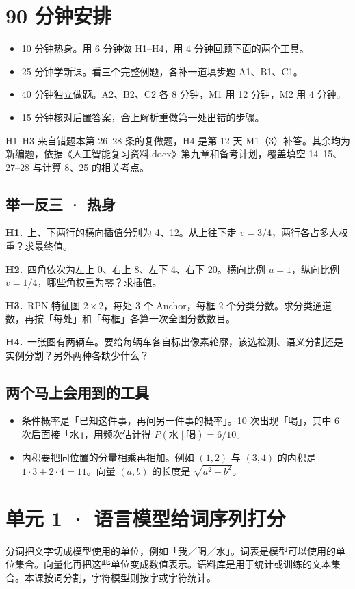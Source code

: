 \documentclass[UTF8,a4paper,11pt]{ctexart}
\newcommand{\CompactQuestion}[2]{\par\noindent\textbf{#1.}\ #2\par\vspace{.8em}}
\begin{document}
\section{90 分钟安排}
\begin{itemize}
\item 10 分钟热身。用 6 分钟做 H1–H4，用 4 分钟回顾下面的两个工具。
\item 25 分钟学新课。看三个完整例题，各补一道填步题 A1、B1、C1。
\item 40 分钟独立做题。A2、B2、C2 各 8 分钟，M1 用 12 分钟，M2 用 4 分钟。
\item 15 分钟核对后置答案，合上解析重做第一处出错的步骤。
\end{itemize}
H1–H3 来自错题本第 26–28 条的复做题，H4 是第 12 天 M1（3）补答。其余均为新编题，依据《人工智能复习资料.docx》第九章和备考计划，覆盖填空 14–15、27–28 与计算 8、25 的相关考点。

\subsection{举一反三 · 热身}
\CompactQuestion{H1}{上、下两行的横向插值分别为 4、12。从上往下走 $v=3/4$，两行各占多大权重？求最终值。}
\CompactQuestion{H2}{四角依次为左上 0、右上 8、左下 4、右下 20。横向比例 $u=1$，纵向比例 $v=1/4$，哪些角权重为零？求插值。}
\CompactQuestion{H3}{RPN 特征图 $2\times2$，每处 3 个 Anchor，每框 2 个分类分数。求分类通道数，再按「每处」和「每框」各算一次全图分数数目。}
\CompactQuestion{H4}{一张图有两辆车。要给每辆车各自标出像素轮廓，该选检测、语义分割还是实例分割？另外两种各缺少什么？}
\subsection{两个马上会用到的工具}
\begin{itemize}
\item 条件概率是「已知这件事，再问另一件事的概率」。10 次出现「喝」，其中 6 次后面接「水」，用频次估计得 $P(\text{水}\mid\text{喝})=6/10$。
\item 内积要把同位置的分量相乘再相加。例如 $(1,2)$ 与 $(3,4)$ 的内积是 $1\cdot3+2\cdot4=11$。向量 $(a,b)$ 的长度是 $\sqrt{a^2+b^2}$。
\end{itemize}
\clearpage
\section{单元 1 · 语言模型给词序列打分}
分词把文字切成模型使用的单位，例如「我／喝／水」。词表是模型可以使用的单位集合。向量化再把这些单位变成数值表示。语料库是用于统计或训练的文本集合。本课按词分割，字符模型则按字或字符统计。
\end{document}
